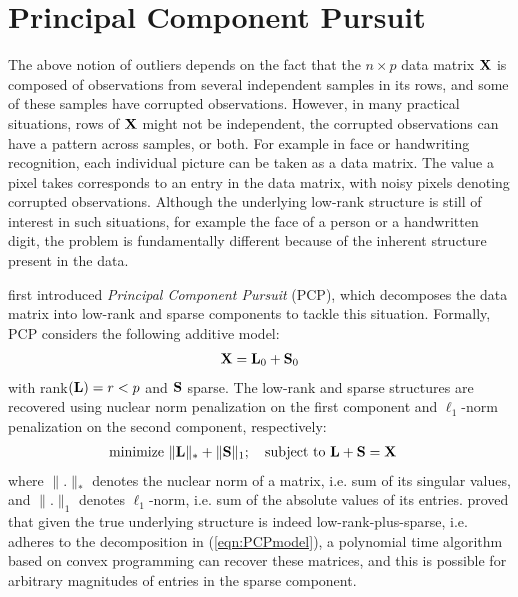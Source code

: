 \section{Principal Component Pursuit}
\label{section:sec3}

The above notion of outliers depends on the fact that the $n \times p$ data matrix ${\mathbf{X}}$ is composed of observations from several independent samples in its rows, and some of these samples have corrupted observations. However, in many practical situations, rows of ${\mathbf{X}}$ might not be independent, the corrupted observations can have a pattern across samples, or both. For example in face or handwriting recognition, each individual picture can be taken as a data matrix. The value a pixel takes corresponds to an entry in the data matrix, with noisy pixels denoting corrupted observations. Although the underlying low-rank structure is still of interest in such situations, for example the face of a person or a handwritten digit, the problem is fundamentally different because of the inherent structure present in the data.

\cite{CandesEtal09} first introduced {\it Principal Component Pursuit} (PCP), which decomposes the data matrix into low-rank and sparse components to tackle this situation. Formally, PCP considers the following additive model:
%
\begin{align}\label{eqn:PCPmodel}
{\mathbf{X}} = {\mathbf{L}}_0 + {\mathbf{S}}_0
\end{align}
%
with rank$({\mathbf{L}}) = r < p$ and ${\mathbf{S}}$ sparse. The low-rank and sparse structures are recovered using nuclear norm penalization on the first component and $\ell_1$-norm penalization on the second component, respectively:
%
\begin{align}\label{eqn:PCPobj}
& \text{minimize } \| {\mathbf{L}} \|_* + \| {\mathbf{S}} \|_1; \quad \text{subject to } {\mathbf{L}} + {\mathbf{S}} = {\mathbf{X}}
\end{align}
%
where $\|.\|_*$ denotes the nuclear norm of a matrix, i.e. sum of its singular values, and $\|.\|_1$ denotes $\ell_1$-norm, i.e. sum of the absolute values of its entries. \cite{CandesEtal09} proved that given the true underlying structure is indeed low-rank-plus-sparse, i.e. adheres to the decomposition in (\ref{eqn:PCPmodel}), a polynomial time algorithm based on convex programming can recover these matrices, and this is possible for arbitrary magnitudes of entries in the sparse component.

